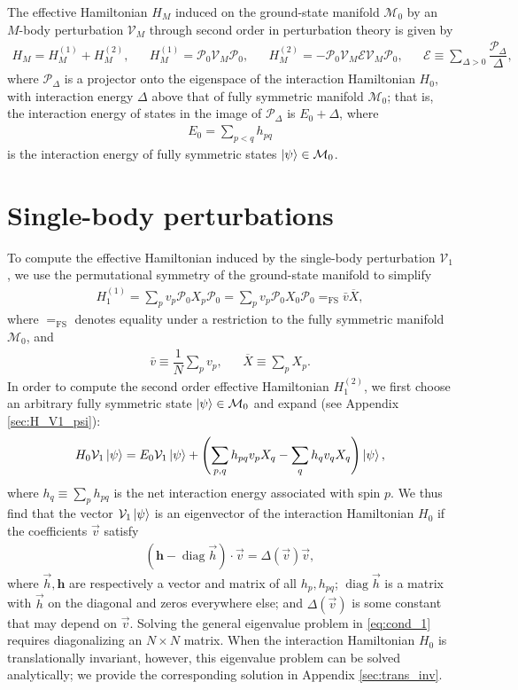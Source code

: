 \documentclass[nofootinbib,notitlepage,11pt]{revtex4-2}
\newcommand{\f}[2]{\dfrac{#1}{#2}} %
\newcommand{\p}[1]{\left(#1\right)} %
\renewcommand{\c}{\cdot} %
\newcommand{\m}{\bm} %
\renewcommand{\v}{\vec} %
\newcommand{\1}{\mathds{1}}
\newcommand{\E}{\mathcal{E}}
\newcommand{\M}{\mathcal{M}}
\renewcommand{\P}{\mathcal{P}}
\newcommand{\V}{\mathcal{V}}
\newcommand{\EQFS}{=_{\text{FS}}}
\newcommand{\col}{\overline}
\DeclareMathOperator{\diag}{diag}
\begin{document}
The effective Hamiltonian $H_M$ induced on the ground-state manifold
$\M_0$ by an $M$-body perturbation $\V_M$ through second order in
perturbation theory is given by\cite{bravyi2011schrieffer,
  perlin2019effective}
\begin{align}
  H_M = H_M^{(1)} + H_M^{(2)},
  &&
  H_M^{(1)} = \P_0 \V_M \P_0,
  &&
  H_M^{(2)} = - \P_0 \V_M \E \V_M \P_0,
  &&
  \E \equiv \sum_{\Delta>0} \f{\P_\Delta}{\Delta},
\end{align}
where $\P_\Delta$ is a projector onto the eigenspace of the
interaction Hamiltonian $H_0$, with interaction energy $\Delta$ above
that of fully symmetric manifold $\M_0$; that is, the interaction
energy of states in the image of $\P_\Delta$ is $E_0+\Delta$, where
\begin{align}
  E_0 = \sum_{p<q} h_{pq}
\end{align}
is the interaction energy of fully symmetric states $\ket\psi\in\M_0$.

\section{Single-body perturbations}
\label{sec:single_body}

To compute the effective Hamiltonian induced by the single-body
perturbation $\V_1$, we use the permutational symmetry of the
ground-state manifold to simplify
\begin{align}
  H_1^{(1)} = \sum_p v_p \P_0 X_p \P_0
  = \sum_p v_p \P_0 X_0 \P_0 \EQFS \bar v \col{X},
  \label{eq:H_1_1}
\end{align}
where $\EQFS$ denotes equality under a restriction to the fully
symmetric manifold $\M_0$, and
\begin{align}
  \bar v \equiv \f1N \sum_p v_p,
  &&
  \col{X} \equiv \sum_p X_p.
\end{align}
In order to compute the second order effective Hamiltonian
$H_1^{(2)}$, we first choose an arbitrary fully symmetric state
$\ket\psi\in\M_0$ and expand (see Appendix \ref{sec:H_V1_psi}):
\begin{align}
  H_0 \V_1 \ket\psi
  = E_0 \V_1 \ket\psi
  + \p{\sum_{p,q} h_{pq} v_p X_q - \sum_q h_q v_q X_q} \ket\psi,
  \label{eq:H_V1_psi}
\end{align}
where $h_q\equiv\sum_p h_{pq}$ is the net interaction energy
associated with spin $p$.  We thus find that the vector $\V_1\ket\psi$
is an eigenvector of the interaction Hamiltonian $H_0$ if the
coefficients $\v v$ satisfy
\begin{align}
  \p{\m h - \diag\v h}\c\v v = \Delta\p{\v v} \v v,
  \label{eq:cond_1}
\end{align}
where $\v h,\m h$ are respectively a vector and matrix of all
$h_p,h_{pq}$; $\diag\v h$ is a matrix with $\v h$ on the diagonal and
zeros everywhere else; and $\Delta\p{\v v}$ is some constant that may
depend on $\v v$.  Solving the general eigenvalue problem in
\eqref{eq:cond_1} requires diagonalizing an $N\times N$ matrix.  When
the interaction Hamiltonian $H_0$ is translationally invariant,
however, this eigenvalue problem can be solved analytically; we
provide the corresponding solution in Appendix \ref{sec:trans_inv}.
\end{document}
